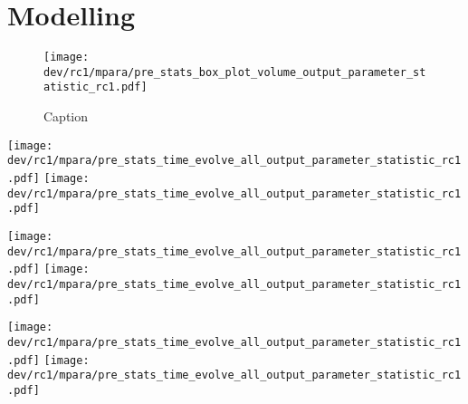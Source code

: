 % 
% 
%
\chapter{Modelling} %
\label{app:modelAnalysis}
%
%
% 
%
\begin{figure}[!h]
    \centering
    \texttt{[image: dev/rc1/mpara/pre\_stats\_box\_plot\_volume\_output\_parameter\_statistic\_rc1.pdf]}
    \caption{Caption}
    \label{app:appModelVolumeBoxPlot}
\end{figure}
%
%
% 
%
%
\setlength{\tikzwidth}{\textwidth}
\begin{sidewaysfigure}[!h]
\centering
\texttt{[image: dev/rc1/mpara/pre\_stats\_time\_evolve\_all\_output\_parameter\_statistic\_rc1.pdf]}
\texttt{[image: dev/rc1/mpara/pre\_stats\_time\_evolve\_all\_output\_parameter\_statistic\_rc1.pdf]}
\label{app:pste1}
\end{sidewaysfigure}
%
\begin{sidewaysfigure}[!h]
\centering
\texttt{[image: dev/rc1/mpara/pre\_stats\_time\_evolve\_all\_output\_parameter\_statistic\_rc1.pdf]}
\texttt{[image: dev/rc1/mpara/pre\_stats\_time\_evolve\_all\_output\_parameter\_statistic\_rc1.pdf]}
\label{app:pste2}
\end{sidewaysfigure}
%
\begin{sidewaysfigure}[!h]
\centering
\texttt{[image: dev/rc1/mpara/pre\_stats\_time\_evolve\_all\_output\_parameter\_statistic\_rc1.pdf]}
\texttt{[image: dev/rc1/mpara/pre\_stats\_time\_evolve\_all\_output\_parameter\_statistic\_rc1.pdf]}
\label{app:pste3}
\end{sidewaysfigure}
